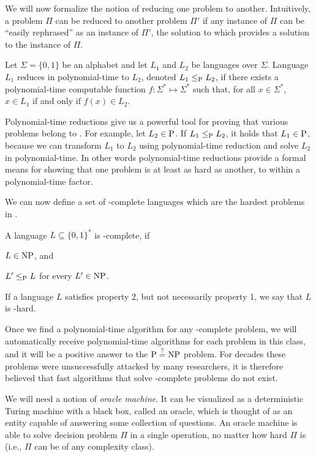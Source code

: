 We will now formalize the notion of reducing one problem to another.
Intuitively, a problem $\Pi$ can be reduced to another problem $\Pi'$ if any instance of $\Pi$ can be ``easily rephrased'' as an instance of $\Pi'$, the solution to which provides a solution to the instance of $\Pi$.

\begin{definition}
	Let $\Sigma=\{0,1\}$ be an alphabet and let $L_1$\! and $L_2$\! be languages over $\Sigma$.
    Language $L_1$\! reduces in polynomial-time to $L_2$, denoted $L_1\le_{\textnormal{P}} L_2$, if there exists a polynomial-time computable function $f\colon\Sigma^*\mapsto\Sigma^*$ such that, for all $x\in\Sigma^*$, $x\in L_1$\! if and only if $f(x)\in L_2$.
\end{definition}

Polynomial-time reductions give us a powerful tool for proving that various problems belong to \Pclass.
For example, let $L_2\in\textnormal{P}$.
If $L_1\le_{\textnormal{P}} L_2$, it holds that $L_1\in\textnormal{P}$, because we can transform $L_1$ to $L_2$ using polynomial-time reduction and solve $L_2$ in polynomial-time.
In other words polynomial-time reductions provide a formal means for showing that one problem is at least as hard as another, to within a polynomial-time factor.

We can now define a set of \NPclass-complete languages which are the hardest problems in \NPclass.

\begin{definition}
    A language $L\subseteq\{0,1\}^*$ is \NPclass-complete, if
	\begin{Enumerate}
		\item $L\in\textnormal{NP}$, and
		\item $L'\le_{\textnormal{P}} L$ for every $L'\in\textnormal{NP}$.
	\end{Enumerate}
	If a language $L$ satisfies property 2, but not necessarily property 1, we say that $L$ is \NPclass-hard.
\end{definition}

Once we find a polynomial-time algorithm for any \NPclass-complete problem, we will automatically receive polynomial-time algorithms for each problem in this class, and it will be a positive answer to the $\textnormal{P}\stackrel{?}{=}\textnormal{NP}$ problem.
For decades these problems were unsuccessfully attacked by many researchers, it is therefore believed that fast algorithms that solve \NPclass-complete problems do not exist.

We will need a notion of \emph{oracle machine}.
It can be visualized as a deterministic Turing machine with a black box, called an oracle, which is thought of as an entity capable of answering some collection of questions.
An oracle machine is able to solve decision problem $\Pi$ in a single operation, no matter how hard $\Pi$ is (i.e., $\Pi$ can be of any complexity class).

